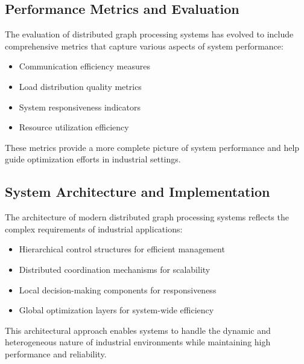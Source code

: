 \subsection{Performance Metrics and Evaluation}
The evaluation of distributed graph processing systems has evolved to include comprehensive metrics that capture various aspects of system performance:
\begin{itemize}
    \item Communication efficiency measures
    \item Load distribution quality metrics
    \item System responsiveness indicators
    \item Resource utilization efficiency
\end{itemize}

These metrics provide a more complete picture of system performance and help guide optimization efforts in industrial settings.

\subsection{System Architecture and Implementation}
The architecture of modern distributed graph processing systems reflects the complex requirements of industrial applications:
\begin{itemize}
    \item Hierarchical control structures for efficient management
    \item Distributed coordination mechanisms for scalability
    \item Local decision-making components for responsiveness
    \item Global optimization layers for system-wide efficiency
\end{itemize}

This architectural approach enables systems to handle the dynamic and heterogeneous nature of industrial environments while maintaining high performance and reliability. 